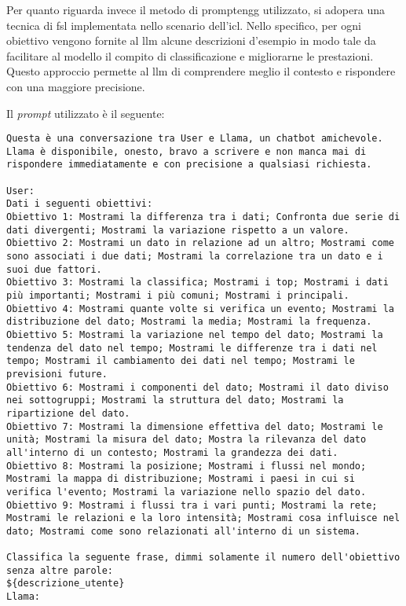 \bigskip
\noindent Per quanto riguarda invece il metodo di \gls{promptengg} utilizzato, si adopera una tecnica di \gls{fsl} implementata nello scenario dell'\gls{icl}.
Nello specifico, per ogni obiettivo vengono fornite al \gls{llm} alcune descrizioni d'esempio in modo tale da facilitare al modello il compito di classificazione e migliorarne le
prestazioni. Questo approccio permette al \gls{llm} di comprendere meglio il contesto e rispondere con una maggiore precisione.

Il \emph{prompt} utilizzato è il seguente:
\begin{lstlisting}[style=std]
Questa è una conversazione tra User e Llama, un chatbot amichevole. Llama è disponibile, onesto, bravo a scrivere e non manca mai di rispondere immediatamente e con precisione a qualsiasi richiesta.

User: 
Dati i seguenti obiettivi:
Obiettivo 1: Mostrami la differenza tra i dati; Confronta due serie di dati divergenti; Mostrami la variazione rispetto a un valore.
Obiettivo 2: Mostrami un dato in relazione ad un altro; Mostrami come sono associati i due dati; Mostrami la correlazione tra un dato e i suoi due fattori.
Obiettivo 3: Mostrami la classifica; Mostrami i top; Mostrami i dati più importanti; Mostrami i più comuni; Mostrami i principali.
Obiettivo 4: Mostrami quante volte si verifica un evento; Mostrami la distribuzione del dato; Mostrami la media; Mostrami la frequenza.
Obiettivo 5: Mostrami la variazione nel tempo del dato; Mostrami la tendenza del dato nel tempo; Mostrami le differenze tra i dati nel tempo; Mostrami il cambiamento dei dati nel tempo; Mostrami le previsioni future.
Obiettivo 6: Mostrami i componenti del dato; Mostrami il dato diviso nei sottogruppi; Mostrami la struttura del dato; Mostrami la ripartizione del dato.
Obiettivo 7: Mostrami la dimensione effettiva del dato; Mostrami le unità; Mostrami la misura del dato; Mostra la rilevanza del dato all'interno di un contesto; Mostrami la grandezza dei dati.
Obiettivo 8: Mostrami la posizione; Mostrami i flussi nel mondo; Mostrami la mappa di distribuzione; Mostrami i paesi in cui si verifica l'evento; Mostrami la variazione nello spazio del dato.
Obiettivo 9: Mostrami i flussi tra i vari punti; Mostrami la rete; Mostrami le relazioni e la loro intensità; Mostrami cosa influisce nel dato; Mostrami come sono relazionati all'interno di un sistema. 

Classifica la seguente frase, dimmi solamente il numero dell'obiettivo senza altre parole: 
${descrizione_utente}
Llama:
\end{lstlisting}

